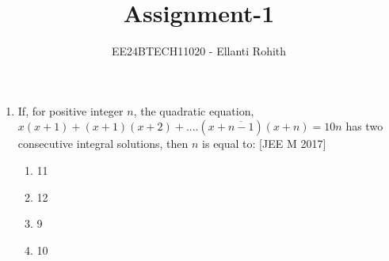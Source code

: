 \documentclass[journal,12pt,twocolumn]{IEEEtran}
\theoremstyle{remark}
\begin{document}

\vspace{3cm}

\title{Assignment-1}
\author{EE24BTECH11020 - Ellanti Rohith%
}
\maketitle
\newpage
\bigskip

\renewcommand{\thefigure}{\theenumi}
\renewcommand{\thetable}{\theenumi}
\begin{enumerate}
	\item {If, for positive integer $n$, the quadratic equation,\vspace{.5em} $x(x+1)+(x+1)(x+2)+....(x+\overline{n-1})(x+n)=10n$ \vspace{.5em} has two consecutive integral solutions, then $n$ is equal to:     \hfill{[JEE M 2017]} \begin{multicols}{2} 
\begin{enumerate}
    \item {11}
    \item{12}
    \columnbreak
    \item {9} 
    \item{10}\end{enumerate} 
    \end{multicols}}



\end{enumerate}
\end{document}
